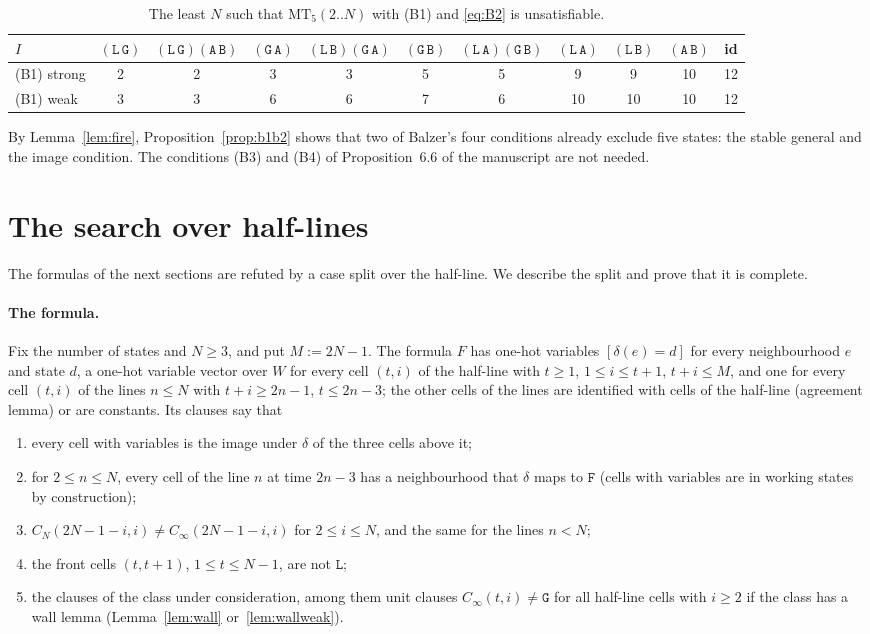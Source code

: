 \documentclass[11pt]{article}
\theoremstyle{remark}
\newcommand{\Lq}{\mathtt{L}}\newcommand{\Gq}{\mathtt{G}}\newcommand{\Aq}{\mathtt{A}}\newcommand{\Bq}{\mathtt{B}}\newcommand{\Fq}{\mathtt{F}}
\newcommand{\MT}{\mathrm{MT}}
\begin{document}
\begin{table}[ht]
\centering\small
\caption{The least $N$ such that $\MT_5(2..N)$ with (B1) and \eqref{eq:B2} is unsatisfiable.}\label{tab:b1b2}
\begin{tabular}{lcccccccccc}
\toprule
$I$ & $(\Lq\,\Gq)$ & $(\Lq\,\Gq)(\Aq\,\Bq)$ & $(\Gq\,\Aq)$ & $(\Lq\,\Bq)(\Gq\,\Aq)$ & $(\Gq\,\Bq)$ & $(\Lq\,\Aq)(\Gq\,\Bq)$ & $(\Lq\,\Aq)$ & $(\Lq\,\Bq)$ & $(\Aq\,\Bq)$ & id\\
\midrule
(B1) strong & 2 & 2 & 3 & 3 & 5 & 5 & 9 & 9 & 10 & 12\\
(B1) weak & 3 & 3 & 6 & 6 & 7 & 6 & 10 & 10 & 10 & 12\\
\bottomrule
\end{tabular}
\end{table}

By Lemma~\ref{lem:fire}, Proposition~\ref{prop:b1b2} shows that two of Balzer's four conditions already exclude
five states: the stable general and the image condition. The conditions (B3) and (B4) of Proposition~6.6 of the
manuscript are not needed.

\section{The search over half-lines}\label{sec:method}

The formulas of the next sections are refuted by a case split over the half-line. We describe the split and
prove that it is complete.

\paragraph{The formula.} Fix the number of states and $N\ge3$, and put $M:=2N-1$. The formula $F$ has one-hot
variables $[\delta(e)=d]$ for every neighbourhood $e$ and state $d$, a one-hot variable vector over $W$ for
every cell $(t,i)$ of the half-line with $t\ge1$, $1\le i\le t+1$, $t+i\le M$, and one for every cell
$(t,i)$ of the lines $n\le N$ with $t+i\ge2n-1$, $t\le2n-3$; the other cells of the lines are identified with
cells of the half-line (agreement lemma) or are constants. Its clauses say that
\begin{enumerate}[label=\textup{(F\arabic*)},nosep]
\item every cell with variables is the image under $\delta$ of the three cells above it;
\item for $2\le n\le N$, every cell of the line $n$ at time $2n-3$ has a neighbourhood that $\delta$ maps to
$\Fq$ (cells with variables are in working states by construction);
\item $C_N(2N-1-i,i)\ne C_\infty(2N-1-i,i)$ for $2\le i\le N$, and the same for the lines $n<N$;
\item the front cells $(t,t+1)$, $1\le t\le N-1$, are not $\Lq$;
\item the clauses of the class under consideration, among them unit clauses $C_\infty(t,i)\ne\Gq$ for all
half-line cells with $i\ge2$ if the class has a wall lemma (Lemma~\ref{lem:wall} or~\ref{lem:wallweak}).
\end{enumerate}
\end{document}
